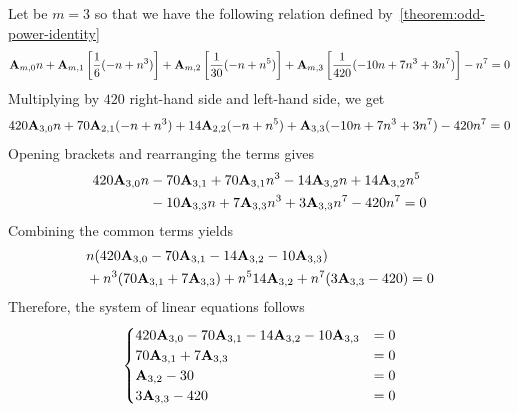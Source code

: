 \begin{example}
    Let be $m=3$ so that we have the following relation defined by~\eqref{theorem:odd-power-identity}
    \begin{equation*}
        {\mathbf{A}} \sb{m,0} n
        + {\mathbf{A}} \sb{m,1} \left[ \frac{1}{6} (-n + n^3) \right]
        + {\mathbf{A}} \sb{m,2} \left[ \frac{1}{30} (-n + n^5) \right]
        + {\mathbf{A}} \sb{m,3} \left[ \frac{1}{420} (-10 n + 7 n^3 + 3 n^7) \right] - n^7 = 0
    \end{equation*}
    Multiplying by $420$ right-hand side and left-hand side, we get
    \begin{equation*}
        420 {\mathbf{A}} \sb{3,0} n + 70 {\mathbf{A}} \sb{2,1} (-n + n^3) + 14 {\mathbf{A}} \sb{2,2} (-n + n^5) + {\mathbf{A}} \sb{3,3} (-10 n + 7 n^3 + 3 n^7) - 420n^7 = 0
    \end{equation*}
    Opening brackets and rearranging the terms gives
    \begin{equation*}
        \begin{split}
            420 {\mathbf{A}} \sb{3,0} n
            &- 70 {\mathbf{A}} \sb{3,1} + 70 {\mathbf{A}} \sb{3,1} n^3 - 14 {\mathbf{A}} \sb{3,2} n + 14 {\mathbf{A}} \sb{3,2} n^5 \\
            &- 10 {\mathbf{A}} \sb{3,3} n + 7 {\mathbf{A}} \sb{3,3} n^3 + 3 {\mathbf{A}} \sb{3,3} n^7 - 420n^7 = 0
        \end{split}
    \end{equation*}
    Combining the common terms yields
    \begin{equation*}
        \begin{split}
            &n (420 {\mathbf{A}} \sb{3,0} - 70 {\mathbf{A}} \sb{3,1} - 14 {\mathbf{A}} \sb{3,2} - 10 {\mathbf{A}} \sb{3,3}) \\
            &+ n^3 (70 {\mathbf{A}} \sb{3,1} + 7 {\mathbf{A}} \sb{3,3})
            + n^5 14 {\mathbf{A}} \sb{3,2}
            + n^7 (3 {\mathbf{A}} \sb{3,3} - 420)
            = 0
        \end{split}
    \end{equation*}
    Therefore, the system of linear equations follows
    \begin{equation*}
        \begin{cases}
            420 {\mathbf{A}} \sb{3,0} - 70 {\mathbf{A}} \sb{3,1} - 14 {\mathbf{A}} \sb{3,2} - 10 {\mathbf{A}} \sb{3,3} &= 0 \\
            70 {\mathbf{A}} \sb{3,1} + 7 {\mathbf{A}} \sb{3,3} &= 0 \\
            {\mathbf{A}} \sb{3,2} - 30 &= 0 \\
            3 {\mathbf{A}} \sb{3,3} - 420 &= 0
        \end{cases}
    \end{equation*}

\end{example}
